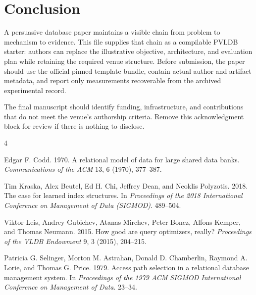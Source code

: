 \section{Conclusion}

A persuasive database paper maintains a visible chain from problem to mechanism
to evidence.  This file supplies that chain as a compilable PVLDB starter:
authors can replace the illustrative objective, architecture, and evaluation
plan while retaining the required venue structure.  Before submission, the
paper should use the official pinned template bundle, contain actual author and
artifact metadata, and report only measurements recoverable from the archived
experimental record.

\begin{acks}
The final manuscript should identify funding, infrastructure, and contributions
that do not meet the venue's authorship criteria.  Remove this acknowledgment
block for review if there is nothing to disclose.
\end{acks}

\begin{thebibliography}{4}

Edgar F. Codd. 1970.
A relational model of data for large shared data banks.
\emph{Communications of the ACM} 13, 6 (1970), 377--387.

Tim Kraska, Alex Beutel, Ed H. Chi, Jeffrey Dean, and Neoklis Polyzotis. 2018.
The case for learned index structures.
In \emph{Proceedings of the 2018 International Conference on Management of
Data (SIGMOD)}. 489--504.

Viktor Leis, Andrey Gubichev, Atanas Mirchev, Peter Boncz, Alfons Kemper, and
Thomas Neumann. 2015.
How good are query optimizers, really?
\emph{Proceedings of the VLDB Endowment} 9, 3 (2015), 204--215.

Patricia G. Selinger, Morton M. Astrahan, Donald D. Chamberlin, Raymond A.
Lorie, and Thomas G. Price. 1979.
Access path selection in a relational database management system.
In \emph{Proceedings of the 1979 ACM SIGMOD International Conference on
Management of Data}. 23--34.

\end{thebibliography}
